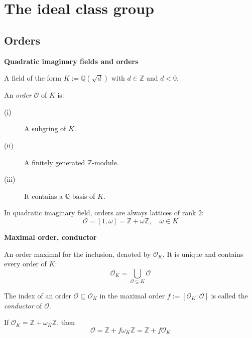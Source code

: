 \documentclass[10pt]{beamer}
\theoremstyle{plain}
\theoremstyle{definition}
\newcommand{\Z}{\mathbb{Z}}
\newcommand{\Q}{\mathbb{Q}}
\newcommand{\mO}{\mathcal{O}}
\renewcommand{\(}{\left(}
\renewcommand{\)}{\right)}
\begin{document}
\section{The ideal class group}

\subsection{Orders}

\begin{frame}

\textbf{Quadratic imaginary fields and orders}

\vspace{0.5cm}

\begin{definition}
A field of the form $K:=\Q(\sqrt{d})$ with $d\in\Z$ and $d<0$.
\end{definition}

\pause

\begin{definition}[Order]
An \emph{order} $\mO$ of $K$ is:
\begin{description}
\item[(i)] A subgring of $K$.
\item[(ii)] A finitely generated $\Z$-module.
\item[(iii)] It contains a $\Q$-basis of $K$.
\end{description}
\end{definition}

\pause

In quadratic imaginary field, orders are always lattices of rank $2$:
\[\mO=[1,\omega]=\Z+\omega\Z, \quad \omega\in K\]

\end{frame}

\begin{frame}

\textbf{Maximal order, conductor}

\vspace{0.5cm}

\begin{definition}
An order maximal for the inclusion, denoted by $\mO_K$. It is unique and contains every order of $K$:
\[\mO_K=\bigcup_{\mO\subseteq K}\mO\]
\end{definition}

\pause

\begin{definition}[Conductor]
The index of an order $\mO\subseteq\mO_K$ in the maximal order $f:=[\mO_K:\mO]$ is called the \emph{conductor} of $\mO$.
\end{definition}

If $\mO_K=\Z+\omega_K\Z$, then
\[\mO=\Z+f\omega_K\Z=\Z+f\mO_K\]

\end{frame}
\end{document}
